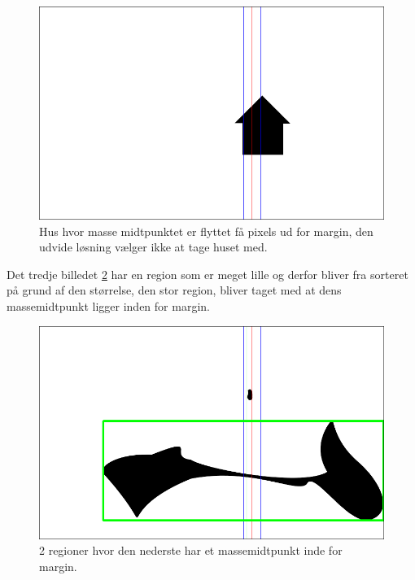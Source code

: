 \begin{figure}[h!!]
	\begin{center}
		\includegraphics[scale=0.3,angle=0]{afsnit/afprovning/billeder/udvidet_losning/udvidet_hus2_test.png}
	\end{center}
	\caption[]{Hus hvor masse midtpunktet er flyttet få pixels ud for margin, den udvide løsning vælger ikke at tage huset med.}
	\label{hus_virker_ikke}
\end{figure}

Det tredje billedet \ref{udvidet_blob_test} har en region som er meget lille
og derfor bliver fra sorteret på grund af den størrelse, den stor
region, bliver taget med at dens massemidtpunkt ligger inden for margin. 

\begin{figure}[h!!]
	\begin{center}
		\includegraphics[scale=0.3,angle=0]{afsnit/afprovning/billeder/udvidet_losning/udvidet_blob2_test.png}
	\end{center}
	\caption[]{2 regioner hvor den nederste har et massemidtpunkt inde for margin.}
	\label{udvidet_blob_test}
\end{figure}

